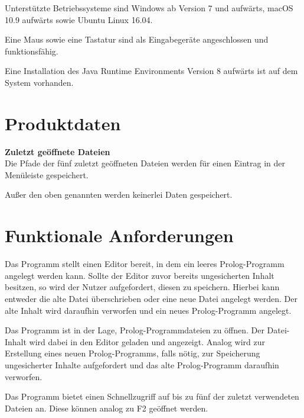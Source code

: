 \documentclass[parskip=full,11pt,twoside]{scrartcl}
\begin{document}
Unterstützte Betriebssysteme sind Windows ab Version 7 und aufwärts, macOS 10.9 aufwärts sowie Ubuntu Linux 16.04.

Eine Maus sowie eine Tastatur sind als Eingabegeräte angeschlossen und funktionsfähig.

Eine Installation des Java Runtime Environments Version 8 aufwärts ist auf dem System vorhanden.

\section{Produktdaten}

\textbf{Zuletzt geöffnete Dateien} \\
Die Pfade der fünf zuletzt geöffneten Dateien werden für einen Eintrag in der Menüleiste gespeichert.

Außer den oben genannten werden keinerlei Daten gespeichert.

\section{Funktionale Anforderungen}


Das Programm stellt einen Editor bereit, in dem ein leeres Prolog-Programm angelegt werden kann. Sollte der Editor zuvor bereits ungesicherten Inhalt besitzen, so wird der Nutzer aufgefordert, diesen zu speichern. Hierbei kann entweder die alte Datei überschrieben oder eine neue Datei angelegt werden. Der alte Inhalt wird daraufhin verworfen und ein neues Prolog-Programm angelegt.


Das Programm ist in der Lage, Prolog-Programmdateien zu öffnen. Der Datei-Inhalt wird dabei in den Editor geladen und angezeigt. Analog wird zur Erstellung eines neuen Prolog-Programms, falls nötig, zur Speicherung ungesicherter Inhalte aufgefordert und das alte Prolog-Programm daraufhin verworfen.


Das Programm bietet einen Schnellzugriff auf bis zu fünf der zuletzt verwendeten Dateien an. Diese können analog zu F2 geöffnet werden.

\end{document}

